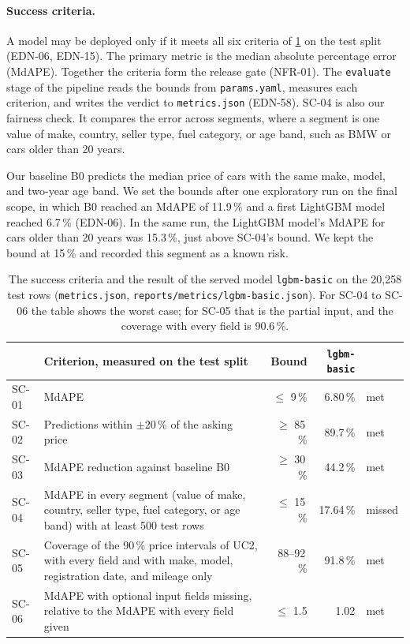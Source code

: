 \paragraph{Success criteria.}
A model may be deployed only if it meets all six criteria of \cref{tab:success-criteria} on the test split (EDN-06, EDN-15).
The primary metric is the median absolute percentage error (MdAPE).
Together the criteria form the release gate (NFR-01).
The \texttt{evaluate} stage of the pipeline reads the bounds from \texttt{params.yaml}, measures each criterion, and writes the verdict to \texttt{metrics.json} (EDN-58).
SC-04 is also our fairness check.
It compares the error across segments, where a segment is one value of make, country, seller type, fuel category, or age band, such as BMW or cars older than 20 years.

Our baseline B0 predicts the median price of cars with the same make, model, and two-year age band.
We set the bounds after one exploratory run on the final scope, in which B0 reached an MdAPE of 11.9\,\% and a first LightGBM model reached 6.7\,\% (EDN-06).
In the same run, the LightGBM model's MdAPE for cars older than 20 years was 15.3\,\%, just above SC-04's bound.
We kept the bound at 15\,\% and recorded this segment as a known risk.

\begin{table}[ht]
  \centering\small
  \begin{tabularx}{\textwidth}{@{}lXrrl@{}}
    \toprule
    & Criterion, measured on the test split & Bound & \texttt{lgbm-basic} & \\
    \midrule
    SC-01 & MdAPE & $\le$ 9\,\% & 6.80\,\% & met \\
    SC-02 & Predictions within $\pm$20\,\% of the asking price & $\ge$ 85\,\% & 89.7\,\% & met \\
    SC-03 & MdAPE reduction against baseline B0 & $\ge$ 30\,\% & 44.2\,\% & met \\
    SC-04 & MdAPE in every segment (value of make, country, seller type, fuel category, or age band) with at least 500 test rows & $\le$ 15\,\% & 17.64\,\% & missed \\
    SC-05 & Coverage of the 90\,\% price intervals of UC2, with every field and with make, model, registration date, and mileage only & 88--92\,\% & 91.8\,\% & met \\
    SC-06 & MdAPE with optional input fields missing, relative to the MdAPE with every field given & $\le$ 1.5 & 1.02 & met \\
    \bottomrule
  \end{tabularx}
  \caption{The success criteria and the result of the served model \texttt{lgbm-basic} on the 20,258 test rows (\texttt{metrics.json}, \texttt{reports/metrics/lgbm-basic.json}). For SC-04 to SC-06 the table shows the worst case; for SC-05 that is the partial input, and the coverage with every field is 90.6\,\%.}
  \label{tab:success-criteria}
\end{table}

